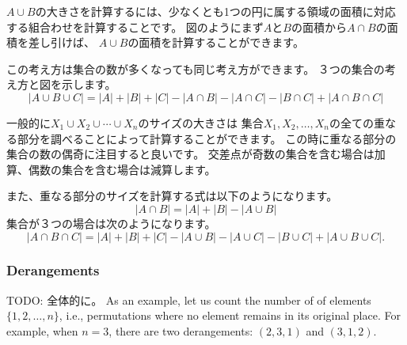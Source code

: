 $A \cup B$の大きさを計算するには、少なくとも1つの円に属する領域の面積に対応する組合わせを計算することです。
図のようにまず$A$と$B$の面積から$A \cap B$の面積を差し引けば、
$A \cup B$の面積を計算することができます。

この考え方は集合の数が多くなっても同じ考え方ができます。
３つの集合の考え方と図を示します。
\[ |A \cup B \cup C| = |A| + |B| + |C| - |A \cap B|  - |A \cap C|  - |B \cap C| + |A \cap B \cap C| \]

\begin{center}
\end{center}

一般的に$X_1 \cup X_2 \cup \cdots \cup X_n$のサイズの大きさは
集合$X_1,X_2,\ldots,X_n$の全ての重なる部分を調べることによって計算することができます。
この時に重なる部分の集合の数の偶奇に注目すると良いです。
交差点が奇数の集合を含む場合は加算、偶数の集合を含む場合は減算します。

また、重なる部分のサイズを計算する式は以下のようになります。
\[ |A \cap B| = |A| + |B| - |A \cup B|\]
集合が３つの場合は次のようになります。
\[ |A \cap B \cap C| = |A| + |B| + |C| - |A \cup B|  - |A \cup C|  - |B \cup C| + |A \cup B \cup C| .\]

\subsubsection{Derangements}


TODO: 全体的に。
As an example, let us count the number of 
of elements $\{1,2,\ldots,n\}$, i.e., permutations
where no element remains in its original place.
For example, when $n=3$, there are
two derangements: $(2,3,1)$ and $(3,1,2)$.

